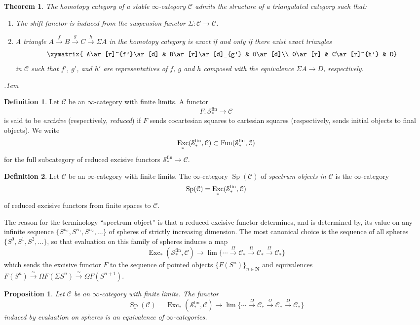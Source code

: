 \documentclass[12pt]{article}
\newtheorem{theorem}{Theorem}[subsection]
\newtheorem{proposition}{Proposition}[subsection]
\theoremstyle{definition}
\newtheorem{definition}{Definition}[subsection]
\newcommand{\C}{\mathcal{C}}
\renewcommand{\S}{\mathcal{S}}
\newcommand{\NN}{\mathbf{N}}
\renewcommand{\i}{\infty}
\newcommand{\too}{\longrightarrow}
\DeclareMathOperator{\Exc}{Exc}
\DeclareMathOperator{\f}{fin}
\DeclareMathOperator{\Fun}{Fun}
\DeclareMathOperator{\Sp}{Sp}
\DeclareMathOperator{\fin}{fin}
\begin{document}
\begin{theorem}{\em \cite[Lemma 1.1.2.13]{HA}}
The homotopy category of a stable $\infty$-category $\C$ admits the structure of a triangulated category such that:
\begin{enumerate}\itemsep.1em
\item[\emph{(1)}]
The shift functor is induced from the suspension functor $\Sigma:\C\to\C$.
\item[\emph{(2)}]
A triangle $A\overset{f}{\to} B\overset{g}{\to} C\overset{h}{\to}\Sigma A$ in the homotopy category is exact if and only if there exist exact triangles
\[
\xymatrix{
A\ar[r]^{f'}\ar[d] & B\ar[r]\ar[d]_{g'} & 0\ar[d]\\
0\ar[r] & C\ar[r]^{h'} & D}
\]
in $\C$ such that $f'$, $g'$, and $h'$ are representatives of $f$, $g$ and $h$ composed with the equivalence $\Sigma A\to D$, respectively.
\end{enumerate}\itemsep.1em
\end{theorem}
\begin{definition}
Let $\C$ be an $\infty$-category with finite limits.
A functor
\[
F:\S_*^{\f}\too\C
\]
is said to be {\em excisive} (respectively, {\em reduced}) if $F$ sends cocartesian squares to cartesian squares (respectively, sends initial objects to final objects).
We write
\[
\Exc_*(\S_*^{\f},\C)\subset\Fun(\S_*^{\f},\C)\index{$\mathrm{\Exc_*}$}
\]
for the full subcategory of reduced excisive functors $\S_*^{\f}\to\C$.
\end{definition}
\begin{definition}
Let $\C$ be an $\infty$-category with finite limits.
The $\infty$-category $\Sp(\C)$ of {\em spectrum objects in $\C$} is the $\infty$-category
\[
\Sp(\C)=\Exc_*(\S_*^{\fin},\C)\index{$\Sp(\C)$}\index{spectrum object}
\]
of reduced excisive functors from finite spaces to $\C$.
\end{definition}
The reason for the terminology ``spectrum object'' is that a reduced excisive functor determines, and is determined by, its value on any infinite sequence $\{S^{n_0}, S^{n_1}, S^{n_2},\ldots\}$ of spheres of strictly increasing dimension.
The most canonical choice is the sequence of all spheres $\{S^0,S^1,S^2,\ldots\}$, so that evaluation on this family of spheres induces a map
\[
\Exc_*(\S_*^{\fin},\C)\too\lim\{\cdots\overset{\Omega}{\to}\C_*\overset{\Omega}{\to}\C_*\overset{\Omega}{\to}\C_*\}
\]
which sends the excisive functor $F$ to the sequence of pointed objects $\{F(S^n)\}_{n\in\NN}$ and equivalences 
$F(S^n)\overset{\simeq}{\too}\Omega F(\Sigma S^n)\overset{\simeq}{\too}\Omega F(S^{n+1})$.
\begin{proposition}{\em \cite[Remark 1.4.2.25]{HA}}
Let $\C$ be an $\i$-category with finite limits. The functor
\[
\Sp(\C)=\Exc_*(\S^{\fin}_*,\C)\too\lim\{\cdots\overset{\Omega}{\to}\C_*\overset{\Omega}{\to}\C_*\overset{\Omega}{\to}\C_*\}
\]
induced by evaluation on spheres is an equivalence of $\i$-categories.
\end{proposition}
\end{document}
